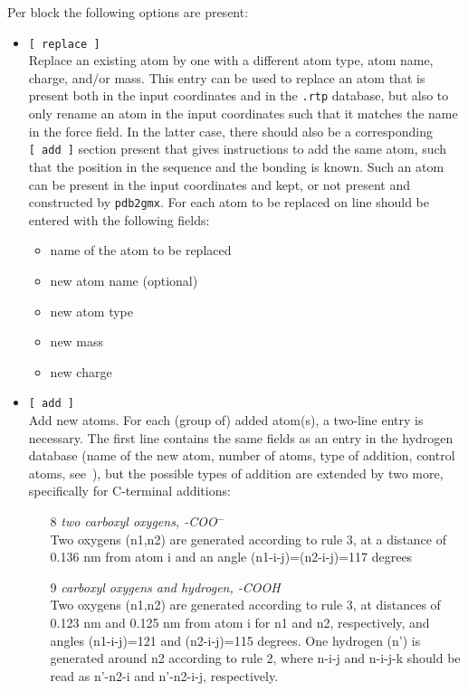 Per block the following options are present:
\begin{itemize}
\item {\tt [~replace~]} \\
Replace an existing atom by one with a different atom type, atom name,
charge, and/or mass. This entry can be used to replace an atom that is
present both in the input coordinates and in the {\tt .rtp} database,
but also to only rename an atom in the input coordinates such that
it matches the name in the force field. In the latter case, there
should also be a corresponding {\tt [~add~]} section present that
gives instructions to add the same atom, such that the position in the sequence
and the bonding is known. Such an atom can be present in the input
coordinates and kept, or not present and constructed by {\tt pdb2gmx}.
For each atom to be replaced on line should be
entered with the following fields:
\begin{itemize}
\item name of the atom to be replaced
\item new atom name (optional)
\item new atom type
\item new mass
\item new charge
\end{itemize}
\item {\tt [~add~]} \\
Add new atoms. For each (group of) added atom(s), a two-line entry is
necessary. The first line contains the same fields as an entry in the
hydrogen database (name of the new atom, 
number of atoms, type of addition, control atoms,
see~), but the possible types of addition are extended
by two more, specifically for C-terminal additions:
\begin{enumerate}
\item[8]{\em two carboxyl oxygens, -COO{$^-$}}\\
Two oxygens (n1,n2) are generated according to rule 3, at a distance
of 0.136 nm from atom i and an angle (n1-i-j)=(n2-i-j)=117 degrees
\item[9]{\em carboxyl oxygens and hydrogen, -COOH}\\
Two oxygens (n1,n2) are generated according to rule 3, at distances of
0.123 nm and 0.125 nm from atom i for n1 and n2, respectively, and angles
(n1-i-j)=121 and (n2-i-j)=115 degrees. One hydrogen (n') is generated
around n2 according to rule 2, where n-i-j and n-i-j-k should be read
as n'-n2-i and n'-n2-i-j, respectively.
\end{enumerate}

\end{itemize}
